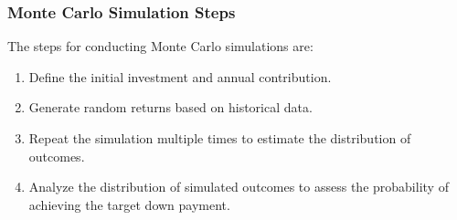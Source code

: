 \subsubsection*{Monte Carlo Simulation Steps}
The steps for conducting Monte Carlo simulations are:
\begin{enumerate}
    \item Define the initial investment and annual contribution.
    \item Generate random returns based on historical data.
    \item Repeat the simulation multiple times to estimate the distribution of outcomes.
    \item Analyze the distribution of simulated outcomes to assess the probability of achieving the target down payment.
\end{enumerate}


